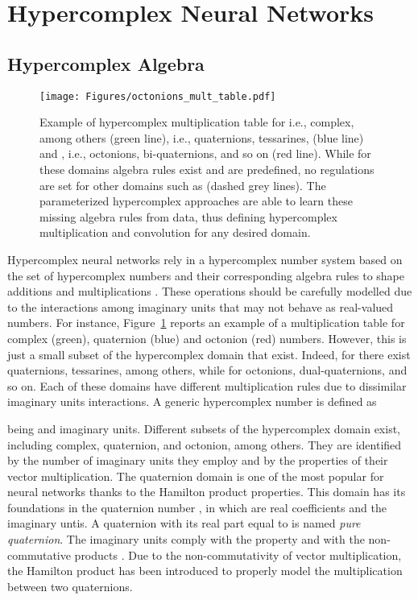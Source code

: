 \documentclass[lettersize,journal]{IEEEtran}
\begin{document}
\section{Hypercomplex Neural Networks}
\label{subsec:real_layers}

\subsection{Hypercomplex Algebra}

\begin{figure}[t]
    \centering
    \texttt{[image: Figures/octonions\_mult\_table.pdf]}
    \caption{Example of hypercomplex multiplication table for  i.e., complex, among others (green line),  i.e., quaternions, tessarines, (blue line) and , i.e., octonions, bi-quaternions, and so on (red line). While for these domains algebra rules exist and are predefined, no regulations are set for other domains such as  (dashed grey lines). The parameterized hypercomplex approaches are able to learn these missing algebra rules from data, thus defining hypercomplex multiplication and convolution for any desired domain.}
    \label{fig:hprod}
\end{figure}

Hypercomplex neural networks rely in a hypercomplex number system based on the set of hypercomplex numbers  and their corresponding algebra rules to shape additions and multiplications \cite{VALLE2021111}. These operations should be carefully modelled due to the interactions among imaginary units that may not behave as real-valued numbers. For instance,  Figure~\ref{fig:hprod} reports an example of a multiplication table for complex (green), quaternion (blue) and octonion (red) numbers. However, this is just a small subset of the hypercomplex domain that exist. Indeed, for  there exist quaternions, tessarines, among others, while for  octonions, dual-quaternions, and so on. Each of these domains have different multiplication rules due to dissimilar imaginary units interactions. A generic hypercomplex number is defined as



\noindent being  and  imaginary units. Different subsets of the hypercomplex domain exist, including complex, quaternion, and octonion, among others. They are identified by the number of imaginary units they employ and by the properties of their vector multiplication.
The quaternion domain is one of the most popular for neural networks thanks to the Hamilton product properties. This domain has its foundations in the quaternion number , in which  are real coefficients and  the imaginary untis. A quaternion with its real part  equal to  is named \textit{pure quaternion}. The imaginary units comply with the property  and with the non-commutative products . Due to the non-commutativity of vector multiplication, the Hamilton product has been introduced to properly model the multiplication between two quaternions.
\end{document}
